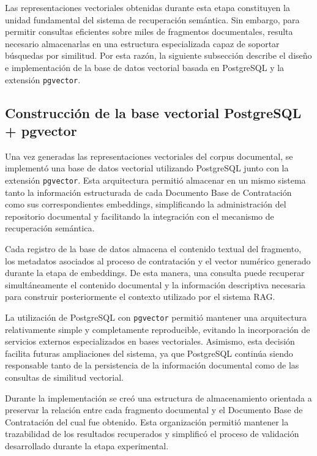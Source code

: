 Las representaciones vectoriales obtenidas durante esta etapa constituyen la unidad fundamental del sistema de recuperación semántica. Sin embargo, para permitir consultas eficientes sobre miles de fragmentos documentales, resulta necesario almacenarlas en una estructura especializada capaz de soportar búsquedas por similitud. Por esta razón, la siguiente subsección describe el diseño e implementación de la base de datos vectorial basada en PostgreSQL y la extensión \texttt{pgvector}.


\subsection{Construcción de la base vectorial PostgreSQL + pgvector}

Una vez generadas las representaciones vectoriales del corpus documental, se implementó una base de datos vectorial utilizando PostgreSQL junto con la extensión \texttt{pgvector}. Esta arquitectura permitió almacenar en un mismo sistema tanto la información estructurada de cada Documento Base de Contratación como sus correspondientes embeddings, simplificando la administración del repositorio documental y facilitando la integración con el mecanismo de recuperación semántica.

Cada registro de la base de datos almacena el contenido textual del fragmento, los metadatos asociados al proceso de contratación y el vector numérico generado durante la etapa de embeddings. De esta manera, una consulta puede recuperar simultáneamente el contenido documental y la información descriptiva necesaria para construir posteriormente el contexto utilizado por el sistema RAG.

La utilización de PostgreSQL con \texttt{pgvector} permitió mantener una arquitectura relativamente simple y completamente reproducible, evitando la incorporación de servicios externos especializados en bases vectoriales. Asimismo, esta decisión facilita futuras ampliaciones del sistema, ya que PostgreSQL continúa siendo responsable tanto de la persistencia de la información documental como de las consultas de similitud vectorial.

Durante la implementación se creó una estructura de almacenamiento orientada a preservar la relación entre cada fragmento documental y el Documento Base de Contratación del cual fue obtenido. Esta organización permitió mantener la trazabilidad de los resultados recuperados y simplificó el proceso de validación desarrollado durante la etapa experimental.


